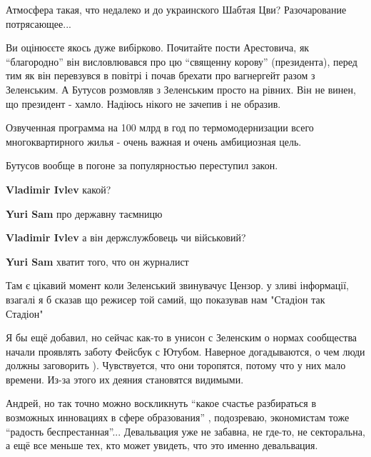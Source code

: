 \begin{itemize}
Атмосфера такая, что недалеко и до украинского Шабтая Цви? Разочарование потрясающее...


Ви оцінюєєте якось дуже вибірково. Почитайте пости Арестовича, як \enquote{благородно}
він висловлювався про цю \enquote{священну корову} (президента), перед тим як він
перевзувся в повітрі і почав брехати про вагнергейт разом з Зеленським. А
Бутусов розмовляв з Зеленським просто на рівних. Він не винен, що президент -
хамло. Надіюсь нікого не зачепив і не образив.


Озвученная программа на 100 млрд в год по термомодернизации всего
многоквартирного жилья - очень важная и очень амбициозная цель.

Бутусов вообще в погоне за популярностью переступил закон.

\begin{itemize} %
\textbf{Vladimir Ivlev} какой?

\textbf{Yuri Sam} про державну таємницю

\textbf{Vladimir Ivlev} а він держслужбовець чи військовий?

\textbf{Yuri Sam} хватит того, что он журналист
\end{itemize} %


Там є цікавий момент коли Зеленський звинувачує Цензор. у зливі інформації,
взагалі я б сказав що режисер той самий, що показував нам "Стадіон так Стадіон"


Я бы ещё добавил, но сейчас как-то в унисон с Зеленским о нормах сообщества
начали проявлять заботу Фейсбук с Ютубом. Наверное догадываются, о чем люди
должны заговорить ). Чувствуется, что они торопятся, потому что у них мало
времени. Из-за этого их деяния становятся видимыми.


Андрей, но так точно можно воскликнуть \enquote{какое счастье разбираться в возможных
инновациях в сфере образования} , подозреваю, экономистам тоже \enquote{радость
беспрестанная}... Девальвация уже не забавна, не где-то, не секторальна, а ещё
все меньше тех, кто может увидеть, что это именно девальвация.



\end{itemize}
